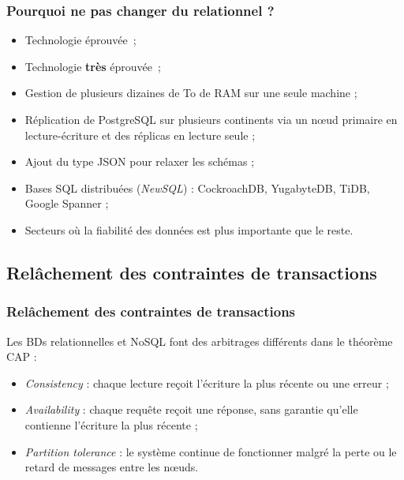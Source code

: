     \begin{frame}
        \frametitle{Pourquoi ne pas changer du relationnel ?}

        \begin{itemize}
            \item Technologie éprouvée ;
            \item Technologie \textbf{très} éprouvée ;
        \end{itemize}

        \begin{itemize}
            \item Gestion de plusieurs dizaines de To de RAM sur une seule machine ;
            \item Réplication de PostgreSQL sur plusieurs continents via un nœud primaire en lecture-écriture et des réplicas en lecture seule ;
            \item Ajout du type JSON pour relaxer les schémas ;
            \item Bases SQL distribuées (\textit{NewSQL}) : CockroachDB, YugabyteDB, TiDB, Google Spanner ;
            \item Secteurs où la fiabilité des données est plus importante que le reste.
        \end{itemize}
    \end{frame}

    \subsection{Relâchement des contraintes de transactions}
    \begin{frame}
        \frametitle{Relâchement des contraintes de transactions}

        Les BDs relationnelles et NoSQL font des arbitrages différents dans le théorème CAP :
        \begin{itemize}
            \item \textit{Consistency} : chaque lecture reçoit l'écriture la plus récente ou une erreur ;
            \item \textit{Availability} : chaque requête reçoit une réponse, sans garantie qu'elle contienne l'écriture la plus récente ;
            \item \textit{Partition tolerance} : le système continue de fonctionner malgré la perte ou le retard de messages entre les nœuds.
        \end{itemize}
    \end{frame}

